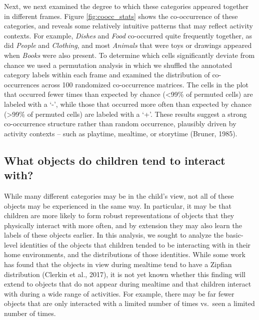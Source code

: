 \documentclass[10pt, letterpaper]{article}
\begin{document}
Next, we next examined the degree to which these categories appeared
together in different frames. Figure \ref{fig:coocc_stats} shows the
co-occurrence of these categories, and reveals some relatively intuitive
patterns that may reflect activity contexts. For example, \emph{Dishes}
and \emph{Food} co-occurred quite frequently together, as did
\emph{People} and \emph{Clothing}, and most \emph{Animals} that were
toys or drawings appeared when \emph{Books} were also present. To
determine which cells significantly deviate from chance we used a
permutation analysis in which we shuffled the annotated category labels
within each frame and examined the distribution of co-occurrences across
100 randomized co-occurrence matrices. The cells in the plot that
occurred fewer times than expected by chance (\textless99\% of permuted
cells) are labeled with a `-', while those that occurred more often than
expected by chance (\textgreater99\% of permuted cells) are labeled with
a `+'. These results suggest a strong co-occurrence structure rather
than random occurrence, plausibly driven by activity contexts -- such as
playtime, mealtime, or storytime (Bruner, 1985).

\hypertarget{what-objects-do-children-tend-to-interact-with}{%
\subsection{What objects do children tend to interact
with?}\label{what-objects-do-children-tend-to-interact-with}}

While many different categories may be in the child's view, not all of
these objects may be experienced in the same way. In particular, it may
be that children are more likely to form robust representations of
objects that they physically interact with more often, and by extension
they may also learn the labels of these objects earlier. In this
analysis, we sought to analyze the basic-level identities of the objects
that children tended to be interacting with in their home environments,
and the distributions of those identities. While some work has found
that the objects in view during mealtime tend to have a Zipfian
distribution (Clerkin et al., 2017), it is not yet known whether this
finding will extend to objects that do not appear during mealtime and
that children interact with during a wide range of activities. For
example, there may be far fewer objects that are only interacted with a
limited number of times vs.~seen a limited number of times.
\end{document}
